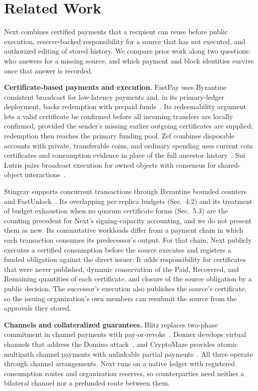 \section{Related Work}
\label{sec:related}

Next combines certified payments that a recipient can reuse before public
execution, reserve-backed responsibility for a source that has not executed,
and authorized editing of stored history. We compare prior work along two
questions: who answers for a missing source, and which payment and block
identities survive once that answer is recorded.

\noindent\textbf{Certificate-based payments and execution.}
FastPay uses Byzantine consistent broadcast for low-latency payments and, in
its primary-ledger deployment, backs redemption with prepaid
funds~\cite{fastpay}. Its redeemability argument lets a valid certificate be
confirmed before all incoming transfers are locally confirmed, provided the
sender's missing earlier outgoing certificates are supplied; redemption then
reaches the primary funding pool. Zef combines disposable accounts with
private, transferable coins, and ordinary spending uses current coin
certificates and consumption evidence in place of the full ancestor
history~\cite{zef}. Sui Lutris pairs broadcast execution for owned objects
with consensus for shared-object interactions~\cite{lutris}.

Stingray supports concurrent transactions through Byzantine bounded counters
and FastUnlock~\cite{stingray}. Its overlapping per-replica budgets
(Sec.~4.2) and its treatment of budget exhaustion when no quorum certificate
forms (Sec.~5.3) are the counting precedent for Next's signing-capacity
accounting, and we do not present them as new. Its commutative workloads
differ from a payment chain in which each transaction consumes its
predecessor's output. For that chain, Next publicly executes a certified
consumption before the source executes and registers a funded obligation
against the direct issuer. It adds responsibility for certificates that were
never published, dynamic conservation of the Paid, Recovered, and Remaining
quantities of each certificate, and closure of the source obligation by a
public decision. The successor's execution also publishes the source's
certificate, so the issuing organization's own members can resubmit the
source from the approvals they stored.

\noindent\textbf{Channels and collateralized guarantees.}
Blitz replaces two-phase commitment in channel payments with
pay-or-revoke~\cite{blitz}, Donner develops virtual channels that address the
Domino attack~\cite{donner}, and CryptoMaze provides atomic multipath channel
payments with unlinkable partial payments~\cite{cryptomaze}. All three operate
through channel arrangements. Next runs on a native ledger with registered
consumption routes and organization reserves, so counterparties need neither a
bilateral channel nor a prefunded route between them.

